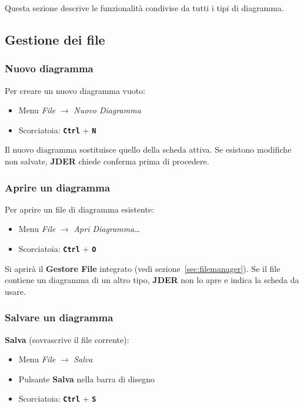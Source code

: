 \documentclass[a4paper,11pt]{article}
\newcommand{\key}[1]{\texttt{\textbf{#1}}}
\newcommand{\menu}[1]{\textit{#1}}
\newcommand{\uielement}[1]{\textbf{#1}}
\newcommand{\jder}{\textbf{JDER}}
\begin{document}
Questa sezione descrive le funzionalità condivise da tutti i tipi di diagramma.

\subsection{Gestione dei file}

\subsubsection{Nuovo diagramma}

Per creare un nuovo diagramma vuoto:
\begin{itemize}
  \item Menu \menu{File} $\to$ \menu{Nuovo Diagramma}
  \item Scorciatoia: \key{Ctrl} + \key{N}
\end{itemize}

Il nuovo diagramma sostituisce quello della scheda attiva. Se esistono modifiche non salvate,
\jder{} chiede conferma prima di procedere.

\subsubsection{Aprire un diagramma}

Per aprire un file di diagramma esistente:
\begin{itemize}
  \item Menu \menu{File} $\to$ \menu{Apri Diagramma\ldots}
  \item Scorciatoia: \key{Ctrl} + \key{O}
\end{itemize}

Si aprirà il \textbf{Gestore File} integrato (vedi sezione~\ref{sec:filemanager}). Se il file
contiene un diagramma di un altro tipo, \jder{} non lo apre e indica la scheda da usare.

\subsubsection{Salvare un diagramma}

\textbf{Salva} (sovrascrive il file corrente):
\begin{itemize}
  \item Menu \menu{File} $\to$ \menu{Salva}
  \item Pulsante \uielement{Salva} nella barra di disegno
  \item Scorciatoia: \key{Ctrl} + \key{S}
\end{itemize}
\end{document}
